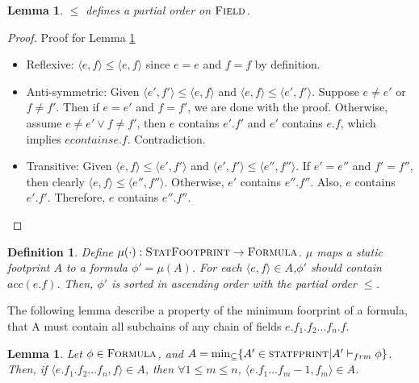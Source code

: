 \documentclass {article}
\newtheorem{lemma}[theorem]{Lemma}
\newtheorem{definition}[theorem]{Definition}
\newcommand{\frm}{\vdash_{frm}}
\newcommand{\formula}{\textsc{Formula}}
\newcommand{\statfprint}{\textsc{StatFootprint}}
\begin{document}
\begin{lemma}
\label{lemma_field_poset}
$\leq$ defines a partial order on $\textsc{Field}$.
\end{lemma}
\begin{proof} Proof for Lemma \ref{lemma_field_poset}
\begin{itemize}
	\item Reflexive: $\langle e,f\rangle  \leq \langle e,f\rangle $ since $e = e$ and $f = f$ by definition.
	\item Anti-symmetric: Given $\langle e',f'\rangle  \leq \langle e,f\rangle $ and $\langle e,f\rangle  \leq \langle e',f'\rangle $. Suppose $e \neq e'$ or $f \neq f'$. Then if $e = e'$ and $f = f'$, we are done with the proof. Otherwise, assume $e \neq e' \vee f \neq f'$, then $e$ contains $e'.f'$ and $e'$ contains $e.f$, which implies $e contains e.f$. Contradiction. 
	\item Transitive: Given $\langle e,f\rangle  \leq \langle e',f'\rangle $ and $\langle e',f'\rangle  \leq \langle e'',f''\rangle $. If $e' = e''$ and $f' = f''$, then clearly $\langle e,f\rangle  \leq \langle e'',f''\rangle $. Otherwise, $e'$ contains $e''.f''$. Also, $e$ contains $e'.f'$. Therefore, $e$ contains $e''.f''$.
\end{itemize}
\end{proof}
\begin{definition}
\label{def_mu}
Define $\mu(\cdot) : \statfprint \rightarrow \formula$. $\mu$ maps a static footprint $A$ to a formula $\phi' = \mu(A)$. For each $\langle e,f \rangle \in A$,$\phi'$ should contain $acc(e.f)$. Then, $\phi'$ is sorted in ascending order with the partial order $\leq$.\\
\end{definition}

The following lemma describe a property of the minimum foorprint of a formula, that A must contain all subchains of any chain of fields $e.f_1.f_2...f_n.f$.\\

\begin{lemma}
\label{lemma_frm_chain} 
Let $\phi \in \formula$, and $A = \min_{\subseteq}\{A' \in \textsc{statfprint} | A' \frm \phi\}$. Then, if $\langle e.f_1.f_2...f_n, f \rangle \in A$, then $\forall 1 \leqslant m \leqslant n$, $\langle e.f_1...f_m-1, f_m \rangle \in A$. 
\end{lemma}
\end{document}
